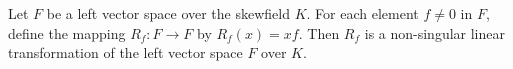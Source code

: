 Let $F$ be a left vector space over the skewfield $K$. For each element $f \neq 0$ in $F$, define the mapping $R_f: F \to F$ by $R_f(x) = x f$. Then $R_f$ is a non-singular linear transformation of the left vector space $F$ over $K$.
